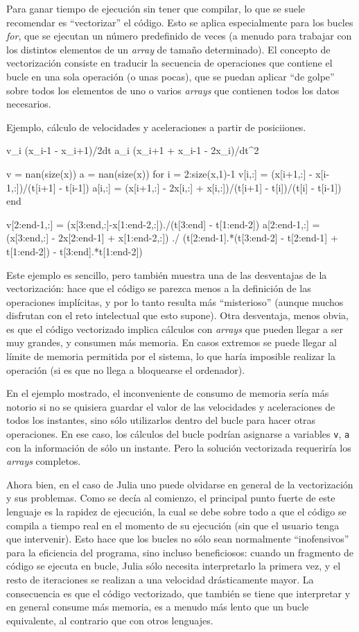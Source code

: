 ﻿\documentclass{article}
\begin{document}
{Para ganar tiempo de ejecución sin tener que compilar, lo que se suele
recomendar es ``vectorizar'' el código. Esto se aplica especialmente para
los bucles \emph{for}, que se ejecutan un número predefinido de veces
(a menudo para trabajar con los distintos elementos de un \emph{array}
de tamaño determinado). El concepto de vectorización consiste en
traducir la secuencia de operaciones que contiene el bucle en una sola
operación (o unas pocas), que se puedan aplicar ``de golpe'' sobre todos los 
elementos de uno o varios \emph{arrays} que contienen todos los datos
necesarios.

Ejemplo, cálculo de velocidades y aceleraciones a partir de posiciiones.

v_i \approx (x_{i-1} - x_{i+1})/2dt
a_i \approx (x_i+1 + x_i-1 - 2x_i)/dt^2


v = nan(size(x))
a = nan(size(x))
for i = 2:size(x,1)-1
  v[i,:] = (x[i+1,:] - x[i-1,:])/(t[i+1] - t[i-1])
  a[i,:] = (x[i+1,:] - 2x[i,:] + x[i,:])/(t[i+1] - t[i])/(t[i] - t[i-1])
end

v[2:end-1,:] = (x[3:end,:]-x[1:end-2,:])./(t[3:end] - t[1:end-2])
a[2:end-1,:] = (x[3:end,:] - 2x[2:end-1] + x[1:end-2,:]) ./
  (t[2:end-1].*(t[3:end-2] - t[2:end-1] + t[1:end-2]) - t[3:end].*t[1:end-2])

Este ejemplo es sencillo, pero también muestra una de las desventajas de
la vectorización: hace que el código se parezca menos a la definición
de las operaciones implícitas, y por lo tanto resulta más ``misterioso''
(aunque muchos disfrutan con el reto intelectual que esto supone).
Otra desventaja, menos obvia, es que el código vectorizado implica
cálculos con \emph{arrays} que pueden llegar a ser muy grandes, y
consumen más memoria. En casos extremos se puede llegar al límite
de memoria permitida por el sistema, lo que haría imposible
realizar la operación (si es que no llega a bloquearse el ordenador).

En el ejemplo mostrado, el inconveniente de consumo de memoria sería
más notorio si no se quisiera guardar el valor de las velocidades y
aceleraciones de todos los instantes, sino sólo utilizarlos dentro
del bucle para hacer otras operaciones. En ese caso, los cálculos del bucle
podrían asignarse a variables \texttt{v}, \texttt{a} con la información de sólo
un instante. Pero la solución vectorizada requeriría los \emph{arrays}
completos.

Ahora bien, en el caso de Julia uno puede olvidarse en general
de la vectorización y sus problemas. Como se decía al comienzo, el principal punto
fuerte de este lenguaje es la rapidez de ejecución, la cual se debe
sobre todo a que el código se compila a tiempo real en el momento de
su ejecución (sin que el usuario tenga que intervenir). Esto hace
que los bucles no sólo sean normalmente ``inofensivos'' para la
eficiencia del programa, sino incluso beneficiosos: cuando un
fragmento de código se ejecuta en bucle, Julia sólo necesita
interpretarlo la primera vez, y el resto de iteraciones se realizan
a una velocidad drásticamente mayor. La consecuencia es que
el código vectorizado, que también se tiene que interpretar y
en general consume más memoria, es a menudo más lento que un bucle
equivalente, al contrario que con otros lenguajes.


}
\end{document}
